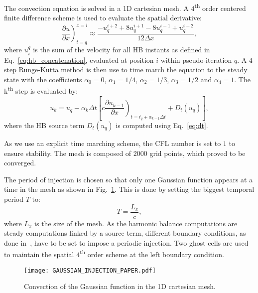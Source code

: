 The convection equation is solved in a 1D cartesian mesh.
A $4$\textsuperscript{th} order centered finite
difference scheme is used to evaluate the spatial derivative:
\begin{equation}
    \left. \frac{\partial u}{\partial x} \right)_{t=q}^{x=i} \approx 
    \frac{-u^{i+2}_{q} + 8 u^{i+1}_{q} - 8 u^{i-1}_{q} + u^{i-2}_{q}}{12\Delta x},
    \label{eq:convection_center4}
\end{equation}
where $u_i^q$ is the sum of the velocity for  
all HB instants as defined in Eq.~\eqref{eq:hb_concatenation},
evaluated at position $i$ within pseudo-iteration $q$.
A $4$ step Runge-Kutta method is then use to time 
march the equation to the steady state with the coefficients $\alpha_0 = 0$,
$\alpha_1 = 1/4$, $\alpha_2 = 1/3$, $\alpha_3 = 1/2$ and $\alpha_4 = 1$.
The k\textsuperscript{th} step is evaluated by:
\begin{equation}
    u_k = u_q - \alpha_k \Delta t \left [ 
          c \left. \frac{\partial u_{k-1}}{\partial x} \right)_{t=t_q + \alpha_{k-1} \Delta t}
          + D_t(u_q)
          \right],
    \label{eq:convection_rk4}
\end{equation}
where the HB source term $D_t(u_q)$ is computed using Eq.~\eqref{eq:dt}. 

As we use 
an explicit time marching scheme, the CFL number is set to $1$ to ensure stability.
The mesh is composed of $2000$ grid points, which proved to be converged.

The period of injection is chosen so that only one Gaussian function 
appears at a time in the mesh
as shown in Fig.~\ref{fig:convection_injection_paper}.
This is done by setting the biggest temporal period $T$ to:
\begin{equation}
   T = \frac{L_x}{c},
\end{equation}
where $L_x$ is the size of the mesh.
As the harmonic balance computations are steady computations linked 
by a source term, 
different boundary conditions, as done in~\cite{Dufour2010},
have to be set to impose a periodic injection. Two ghost cells
are used to maintain the spatial $4$\textsuperscript{th} order scheme 
at the left
boundary condition.
\begin{figure}[htbp]
  \begin{center}
    \texttt{[image: GAUSSIAN\_INJECTION\_PAPER.pdf]}
  \end{center}
  \caption{Convection of the Gaussian function in the 1D cartesian mesh.}
  \label{fig:convection_injection_paper}
\end{figure}

